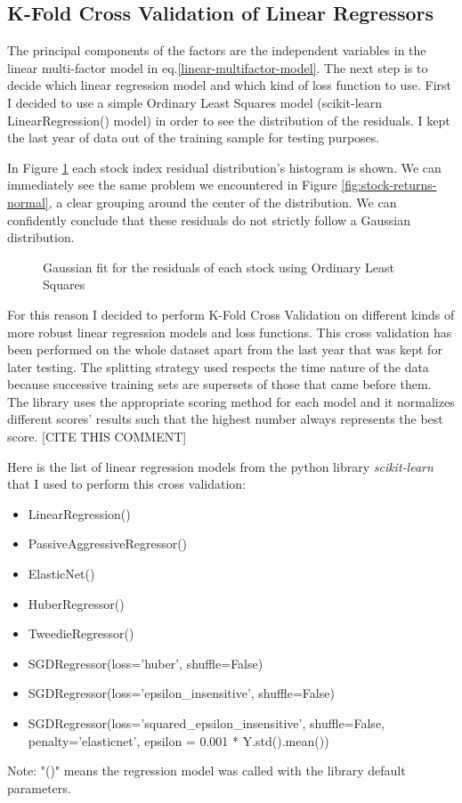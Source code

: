 \subsection{K-Fold Cross Validation of Linear Regressors}
\label{crossval}
The principal components of the factors are the independent variables in the linear multi-factor model in eq.\eqref{linear-multifactor-model}. The next step is to decide which linear regression model and which kind of loss function to use.
First I decided to use a simple Ordinary Least Squares model (scikit-learn LinearRegression() model) in order to see the distribution of the residuals. I kept the last year of data out of the training sample for testing purposes.

In Figure \ref{fig:linreg-residuals} each stock index residual distribution's histogram is shown. We can immediately see the same problem we encountered in Figure \ref{fig:stock-returns-normal}, a clear grouping around the center of the distribution. We can confidently conclude that these residuals do not strictly follow a Gaussian distribution.

\begin{figure}[htb]
	\centering
	
	\caption{Gaussian fit for the residuals of each stock using Ordinary Least Squares}
	\label{fig:linreg-residuals}
\end{figure}

For this reason I decided to perform K-Fold Cross Validation on different kinds of more robust linear regression models and loss functions. This cross validation has been performed on the whole dataset apart from the last year that was kept for later testing. The splitting strategy used respects the time nature of the data because successive training sets are supersets of those that came before them.
The library uses the appropriate scoring method for each model and it normalizes different scores' results such that the highest number always represents the best score. [CITE THIS COMMENT]

Here is the list of linear regression models from the python library \textit{scikit-learn} that I used to perform this cross validation:
\begin{itemize}
	\item LinearRegression()
	\item PassiveAggressiveRegressor()
	\item ElasticNet()
	\item HuberRegressor()
	\item TweedieRegressor()
	\item SGDRegressor(loss='huber', shuffle=False)
	\item SGDRegressor(loss='epsilon\_insensitive', shuffle=False)
	\item SGDRegressor(loss='squared\_epsilon\_insensitive', shuffle=False, penalty='elasticnet', epsilon = 0.001 * Y.std().mean())
\end{itemize}
Note: "()" means the regression model was called with the library default parameters.



